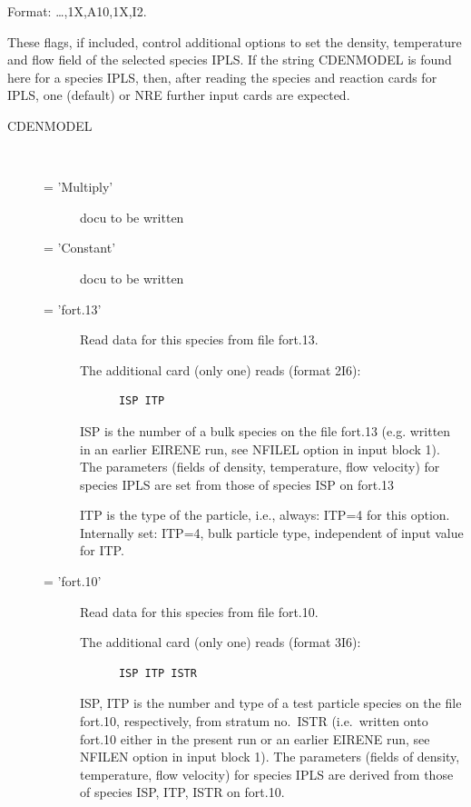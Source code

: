 Format: \dots,1X,A10,1X,I2.

These flags, if included, control additional options to set the density,
temperature and flow field of the selected species IPLS.
If the string CDENMODEL is found here for a species IPLS, then, after reading
the species and reaction cards for IPLS, one (default) or NRE further input
cards are expected.
\begin{description}
  \item[CDENMODEL] ~

        \begin{description}
          \item[= 'Multiply'] docu to be written
          \item[= 'Constant']
                docu to be written
          \item[= 'fort.13'] Read data for this species from file
                fort.13.

                The additional card (only one) reads (format 2I6):

                \begin{lstlisting}
      ISP ITP
\end{lstlisting}

                ISP is the number of a bulk species on the file fort.13 (e.g. written in an
                earlier EIRENE run, see NFILEL option in input block 1).
                The parameters (fields of density, temperature, flow velocity) for species IPLS
                are set from those of species ISP on fort.13

                ITP is the type of the particle, i.e., always: ITP=4 for this option.
                Internally set: ITP=4, bulk particle type, independent of input value for ITP.

          \item[= 'fort.10'] Read data for this species from file fort.10.

                The additional card (only one) reads (format 3I6):

                \begin{lstlisting}
      ISP ITP ISTR
\end{lstlisting}

                ISP, ITP is the number and type of a test particle species on the file fort.10,
                respectively, from stratum no.\ ISTR (i.e.\ written onto fort.10 either in the
                present run or an earlier EIRENE run, see NFILEN option in input block 1).
                The parameters (fields of density, temperature, flow velocity) for species IPLS
                are derived from those of species ISP, ITP, ISTR on fort.10.


\end{description}
\end{description}
